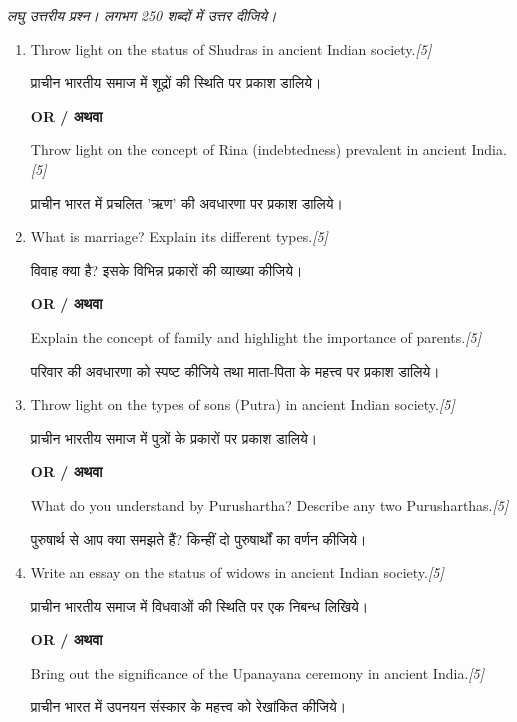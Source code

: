 \documentclass[11pt,a4paper]{article}
\newcommand{\pts}[1]{\hfill \textit{[#1]}}
\begin{document}
\noindent \textit{लघु उत्तरीय प्रश्न। लगभग 250 शब्दों में उत्तर दीजिये।}

\begin{enumerate}[label=\textbf{\arabic*.},leftmargin=*,start=4,itemsep=10pt]

  \item Throw light on the status of Shudras in ancient Indian society.\pts{5}
  
  प्राचीन भारतीय समाज में शूद्रों की स्थिति पर प्रकाश डालिये।

  \begin{center}\textbf{OR / अथवा}\end{center}

  Throw light on the concept of Rina (indebtedness) prevalent in ancient India.\pts{5}
  
  प्राचीन भारत में प्रचलित 'ऋण' की अवधारणा पर प्रकाश डालिये।

  \item What is marriage? Explain its different types.\pts{5}
  
  विवाह क्या है? इसके विभिन्न प्रकारों की व्याख्या कीजिये।

  \begin{center}\textbf{OR / अथवा}\end{center}

  Explain the concept of family and highlight the importance of parents.\pts{5}
  
  परिवार की अवधारणा को स्पष्ट कीजिये तथा माता-पिता के महत्त्व पर प्रकाश डालिये।

  \item Throw light on the types of sons (Putra) in ancient Indian society.\pts{5}
  
  प्राचीन भारतीय समाज में पुत्रों के प्रकारों पर प्रकाश डालिये।

  \begin{center}\textbf{OR / अथवा}\end{center}

  What do you understand by Purushartha? Describe any two Purusharthas.\pts{5}
  
  पुरुषार्थ से आप क्या समझते हैं? किन्हीं दो पुरुषार्थों का वर्णन कीजिये।

  \item Write an essay on the status of widows in ancient Indian society.\pts{5}
  
  प्राचीन भारतीय समाज में विधवाओं की स्थिति पर एक निबन्ध लिखिये।

  \begin{center}\textbf{OR / अथवा}\end{center}

  Bring out the significance of the Upanayana ceremony in ancient India.\pts{5}
  
  प्राचीन भारत में उपनयन संस्कार के महत्त्व को रेखांकित कीजिये।

\end{enumerate}
\end{document}
